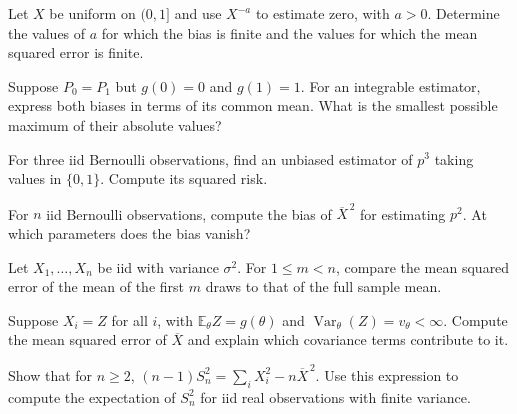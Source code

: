\documentclass[11pt,oneside]{book}
\theoremstyle{definition}
\theoremstyle{remark}
\begin{document}
\begin{practiceexercise}
\label{pex:mse-uniform-power}
Let $X$ be uniform on $(0,1]$ and use $X^{-a}$ to estimate zero,
with $a>0$. Determine the values of $a$ for which the bias is
finite and the values for which the mean squared error is finite.
\end{practiceexercise}

\begin{practiceexercise}
\label{pex:mse-same-law-two-targets}
Suppose $P_0=P_1$ but $g(0)=0$ and $g(1)=1$. For an integrable
estimator, express both biases in terms of its common mean.
What is the smallest possible maximum of their absolute values?
\end{practiceexercise}

\begin{practiceexercise}
\label{pex:mse-cubic-bernoulli-three-bits}
For three iid Bernoulli observations, find an unbiased estimator
of $p^3$ taking values in $\{0,1\}$. Compute its squared risk.
\end{practiceexercise}

\begin{practiceexercise}
\label{pex:mse-squared-frequency-bias}
For $n$ iid Bernoulli observations, compute the bias of
$\overline X^{\,2}$ for estimating $p^2$. At which parameters
does the bias vanish?
\end{practiceexercise}

\begin{practiceexercise}
\label{pex:mse-two-sample-sizes}
Let $X_1,\ldots,X_n$ be iid with variance $\sigma^2$. For
$1\leq m<n$, compare the mean squared error of the mean of
the first $m$ draws to that of the full sample mean.
\end{practiceexercise}

\begin{practiceexercise}
\label{pex:mse-repeated-single-draw}
Suppose $X_i=Z$ for all $i$, with $\mathbb E_\theta Z=g(\theta)$
and $\operatorname{Var}_\theta(Z)=v_\theta<\infty$.
Compute the mean squared error of $\overline X$ and explain
which covariance terms contribute to it.
\end{practiceexercise}

\begin{practiceexercise}
\label{pex:mse-sample-variance-raw-moments}
Show that for $n\geq2$,
$(n-1)S_n^2=\sum_i X_i^2-n\overline X^{\,2}$.
Use this expression to compute the expectation of $S_n^2$ for
iid real observations with finite variance.
\end{practiceexercise}
\end{document}

